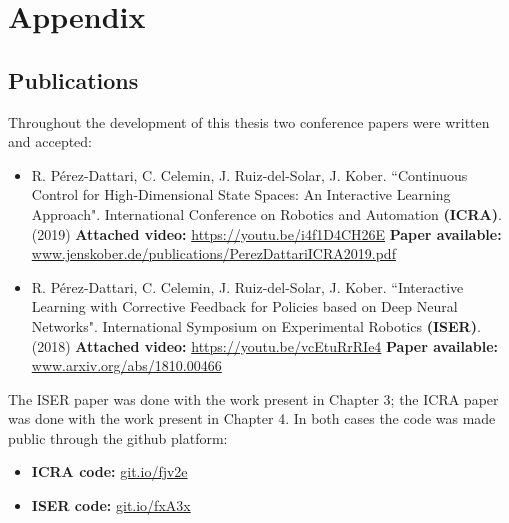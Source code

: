 \chapter{Appendix}
\section{Publications}
Throughout the development of this thesis two conference papers were written and accepted:

\begin{itemize}
    \item R. Pérez-Dattari, C. Celemin, J. Ruiz-del-Solar, J. Kober. ``Continuous Control for High-Dimensional State Spaces: An Interactive Learning Approach". International Conference on Robotics and Automation \textbf{(ICRA)}. (2019) \cite{perez2019continuous}
    \newline\textbf{Attached video:} \url{https://youtu.be/i4f1D4CH26E}
    \newline\color{blue}\textbf{Paper available:} \color{black} \url{www.jenskober.de/publications/PerezDattariICRA2019.pdf}
    
    \vspace{0.5cm}
    
    \item R. Pérez-Dattari, C. Celemin, J. Ruiz-del-Solar, J. Kober. ``Interactive Learning with Corrective Feedback for Policies based on Deep Neural Networks". International Symposium on Experimental Robotics \textbf{(ISER)}. (2018) \cite{perez2018interactive}
    \newline\textbf{Attached video:} \url{https://youtu.be/vcEtuRrRIe4}
    \newline\color{blue}\textbf{Paper available:} \color{black} \url{www.arxiv.org/abs/1810.00466}
\end{itemize}

The ISER paper was done with the work present in Chapter 3; the ICRA paper was done with the work present in Chapter 4. In both cases the code was made public through the github platform:

\begin{itemize}
    \item \textbf{ICRA code:} \url{git.io/fjv2e}
    
    \vspace{0.5cm}
    
    \item \textbf{ISER code:} \url{git.io/fxA3x}
\end{itemize}
